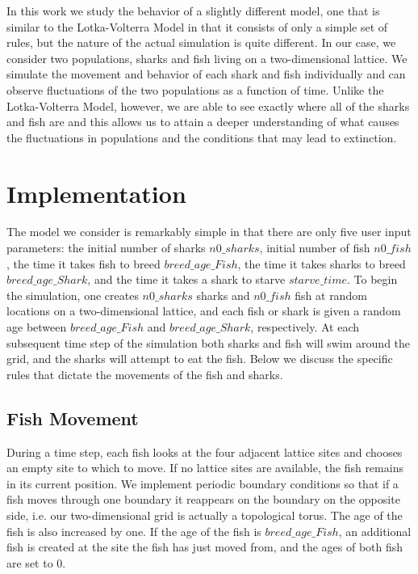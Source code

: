 \documentclass[aps,prl,preprint,superscriptaddress]{revtex4}
\begin{document}
In this work we study the behavior of a slightly different model, one that  is similar to the Lotka-Volterra Model in that it consists of only a simple set of rules, but the nature of the actual simulation is quite different. In our case, we consider two populations, sharks and fish living on a two-dimensional lattice. We simulate the movement and behavior of each shark and fish individually and can observe fluctuations of the two populations as a function of time. Unlike the Lotka-Volterra Model, however, we are able to see exactly where all of the sharks and fish are and this allows us to attain a deeper understanding of what causes the fluctuations in populations and the conditions that may lead to extinction. 
	
\section{Implementation}

The model we consider is remarkably simple in that there are only five user input parameters: the initial number of sharks $n0\_sharks$, initial number of fish $n0\_fish$, the time it takes fish to breed $breed\_age\_Fish$, the time it takes sharks to breed $breed\_age\_Shark$, and the time it takes a shark to starve $starve\_time$. To begin the simulation, one creates $n0\_sharks$ sharks and $n0\_fish$ fish at random locations on a two-dimensional lattice, and each fish or shark is given a random age between $breed\_age\_Fish$ and $breed\_age\_Shark$, respectively. At each subsequent time step of the simulation both sharks and fish will swim around the grid, and the sharks will attempt to eat the fish. Below we discuss the specific rules that dictate the movements of the fish and sharks.

\subsection{Fish Movement}
During a time step, each fish looks at the four adjacent lattice sites and chooses an empty site to which to move. If no lattice sites are available, the fish remains in its current position. We implement periodic boundary conditions so that if a fish moves through one boundary it reappears on the boundary on the opposite side, i.e. our two-dimensional grid is actually a topological torus. The age of the fish is also increased by one. If the age of the fish is $breed\_age\_Fish$, an additional fish is created at the site the fish has just moved from, and the ages of both fish are set to 0.
\end{document}
